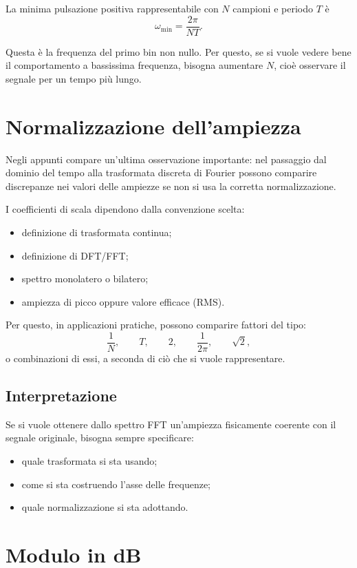 La minima pulsazione positiva rappresentabile con \(N\) campioni e periodo \(T\) è
\[
\omega_{\min}=\frac{2\pi}{NT}.
\]

Questa è la frequenza del primo bin non nullo.
Per questo, se si vuole vedere bene il comportamento a bassissima frequenza,
bisogna aumentare \(N\), cioè osservare il segnale per un tempo più lungo.

\section{Normalizzazione dell'ampiezza}

Negli appunti compare un'ultima osservazione importante:
nel passaggio dal dominio del tempo alla trasformata discreta di Fourier
possono comparire discrepanze nei valori delle ampiezze se non si usa la corretta normalizzazione.

I coefficienti di scala dipendono dalla convenzione scelta:
\begin{itemize}
    \item definizione di trasformata continua;
    \item definizione di DFT/FFT;
    \item spettro monolatero o bilatero;
    \item ampiezza di picco oppure valore efficace (RMS).
\end{itemize}

Per questo, in applicazioni pratiche, possono comparire fattori del tipo:
\[
\frac{1}{N},\qquad
T,\qquad
2,\qquad
\frac{1}{2\pi},\qquad
\sqrt{2},
\]
o combinazioni di essi, a seconda di ciò che si vuole rappresentare.

\subsection*{Interpretazione}

Se si vuole ottenere dallo spettro FFT un'ampiezza fisicamente coerente con il segnale originale,
bisogna sempre specificare:
\begin{itemize}
    \item quale trasformata si sta usando;
    \item come si sta costruendo l'asse delle frequenze;
    \item quale normalizzazione si sta adottando.
\end{itemize}

\section{Modulo in dB}

